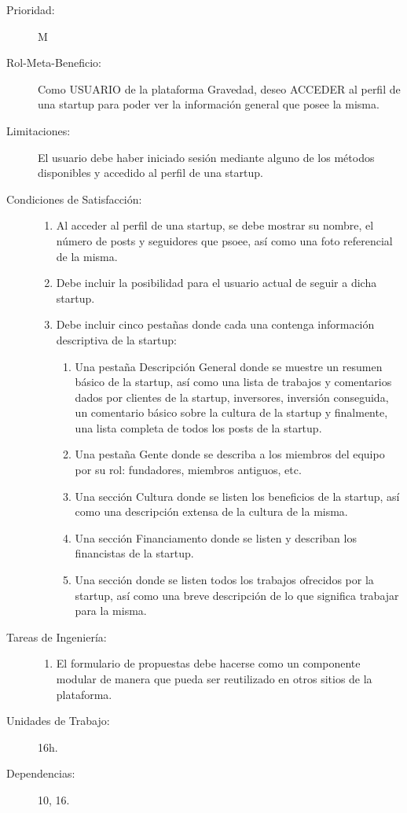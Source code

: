\begin{description}
    \item[Prioridad:] M
    \item[Rol-Meta-Beneficio:] Como USUARIO de la plataforma Gravedad, deseo ACCEDER al perfil de una startup para poder ver la información general que posee la misma.
    \item[Limitaciones:]  El usuario debe haber iniciado sesión mediante alguno de los métodos disponibles y accedido al perfil de una startup.
    \item[Condiciones de Satisfacción:]  \hfill
        \begin{enumerate}
            \item Al acceder al perfil de una startup, se debe mostrar su nombre, el número de posts y seguidores que psoee, así como una foto referencial de la misma.
    		\item Debe incluir la posibilidad para el usuario actual de seguir a dicha startup.
    		\item Debe incluir cinco pestañas donde cada una contenga información descriptiva de la startup:
    		    \begin{enumerate}
    		        \item Una pestaña Descripción General donde se muestre un resumen básico de la startup, así como una lista de trabajos y comentarios dados por clientes de la startup, inversores, inversión conseguida, un comentario básico sobre la cultura de la startup y finalmente, una lista completa de todos los posts de la startup.
        			\item Una pestaña Gente donde se describa a los miembros del equipo por su rol: fundadores, miembros antiguos, etc.
        			\item Una sección Cultura donde se listen los beneficios de la startup, así como una descripción extensa de la cultura de la misma.
        			\item Una sección Financiamento donde se listen y describan los financistas de la startup.
        			\item Una sección donde se listen todos los trabajos ofrecidos por la startup, así como una breve descripción de lo que significa trabajar para la misma.
    		    \end{enumerate}
        \end{enumerate}
    \item[Tareas de Ingeniería:]  \hfill
        \begin{enumerate}
            \item El formulario de propuestas debe hacerse como un componente modular de manera que pueda ser reutilizado en otros sitios de la plataforma.
        \end{enumerate}
    \item[Unidades de Trabajo:] 16h.
    \item[Dependencias:] 10, 16.
\end{description}

